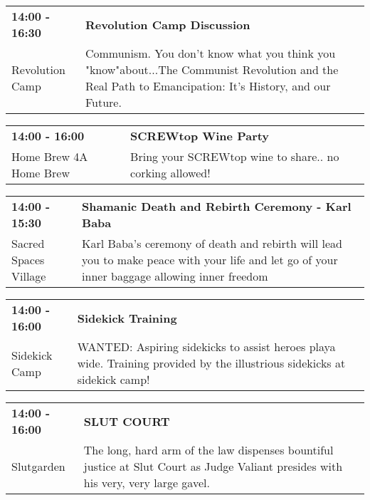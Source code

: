 \begin{tabular}{ p{1in} p{2.2in} }
    \textbf{14:00 - 16:30} & \textbf{Revolution Camp Discussion} \\
    Revolution Camp \newline  & Communism. You don't know what you think you "know"about...The Communist Revolution and the Real Path to Emancipation: It's History, and our Future. \\
    \hline 
\end{tabular}
    
\begin{tabular}{ p{1in} p{2.2in} }
    \textbf{14:00 - 16:00} & \textbf{SCREWtop Wine Party} \\
    Home Brew 4A Home Brew \newline  & Bring your SCREWtop wine to share.. no corking allowed! \\
    \hline 
\end{tabular}
    
\begin{tabular}{ p{1in} p{2.2in} }
    \textbf{14:00 - 15:30} & \textbf{Shamanic Death and Rebirth Ceremony - Karl Baba} \\
    Sacred Spaces Village \newline  & Karl Baba's ceremony of death and rebirth will lead you to make peace with your life and let go of your inner baggage allowing inner freedom \\
    \hline 
\end{tabular}
    
\begin{tabular}{ p{1in} p{2.2in} }
    \textbf{14:00 - 16:00} & \textbf{Sidekick Training} \\
    Sidekick Camp \newline  & WANTED: Aspiring sidekicks to assist heroes playa wide. Training provided  by the illustrious sidekicks at sidekick camp! \\
    \hline 
\end{tabular}
    
\begin{tabular}{ p{1in} p{2.2in} }
    \textbf{14:00 - 16:00} & \textbf{SLUT COURT} \\
    Slutgarden \newline  & The long, hard arm of the law dispenses bountiful justice at Slut Court as Judge Valiant presides with his very, very large gavel. \\
    \hline 
\end{tabular}
    
